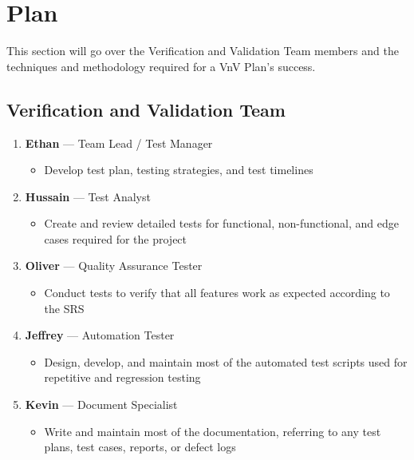 \documentclass[12pt, titlepage]{article}
\begin{document}
\section{Plan}

This section will go over the Verification and Validation Team members and the techniques
and methodology required for a VnV Plan's success.

\subsection{Verification and Validation Team}

\begin{enumerate}
    \item \textbf{Ethan} --- Team Lead / Test Manager
    \begin{itemize}
        \item Develop test plan, testing strategies, and test timelines
    \end{itemize}

    \item \textbf{Hussain} --- Test Analyst
    \begin{itemize}
        \item Create and review detailed tests for functional, non-functional,
         and edge cases required for the project
    \end{itemize}

    \item \textbf{Oliver} --- Quality Assurance Tester
    \begin{itemize}
        \item Conduct tests to verify that all features work as
        expected according to the SRS
    \end{itemize}

    \item \textbf{Jeffrey} --- Automation Tester
    \begin{itemize}
        \item Design, develop, and maintain most of the automated
        test scripts used for repetitive and regression testing
    \end{itemize}

    \item \textbf{Kevin} --- Document Specialist
    \begin{itemize}
        \item Write and maintain most of the documentation,
        referring to any test plans, test cases, reports, or defect logs
    \end{itemize}
\end{enumerate}
\end{document}
